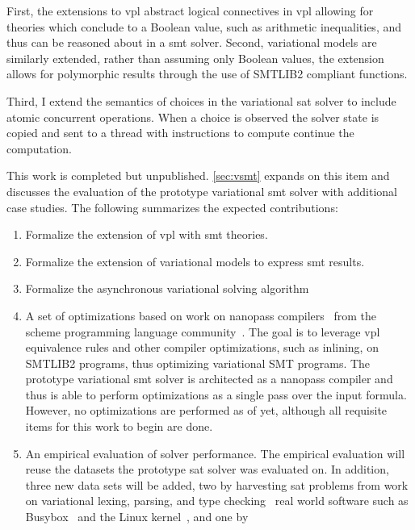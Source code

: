 \begin{enumerate}
  First, the extensions to \ac{vpl} abstract logical connectives in \ac{vpl}
  allowing for theories which conclude to a Boolean value, such as arithmetic
  inequalities, and thus can be reasoned about in a \ac{smt} solver. Second,
  variational models are similarly extended, rather than assuming only Boolean
  values, the extension allows for polymorphic results through the use of
  SMTLIB2 compliant functions.

  Third, I extend the semantics of choices in the variational \ac{sat} solver to
  include atomic concurrent operations. When a choice is observed the solver
  state is copied and sent to a thread with instructions to compute continue the
  computation.

  This work is completed but unpublished. \autoref{sec:vsmt} expands on this
  item and discusses the evaluation of the prototype variational \ac{smt} solver
  with additional case studies. The following summarizes the expected
  contributions:
  \begin{enumerate}
  \item \checkmark{} Formalize the extension of \ac{vpl} with \ac{smt} theories.
  \item \checkmark{} Formalize the extension of variational models to express
    \ac{smt} results.
  \item \checkmark{} Formalize the asynchronous variational solving algorithm
  \item\label{nanopass-deliverable} A set of optimizations based on work on
    nanopass compilers~\cite{10.1145/2500365.2500618} from the scheme
    programming language community~\cite{r7rs-scheme}. The goal is to leverage
    \ac{vpl} equivalence rules and other compiler optimizations, such as
    inlining, on SMTLIB2 programs, thus optimizing variational SMT programs. The
    prototype variational \ac{smt} solver is architected as a nanopass compiler
    and thus is able to perform optimizations as a single pass over the input
    formula. However, no optimizations are performed as of yet, although all
    requisite items for this work to begin are done.
  \item \label{eval-deliverable}An empirical evaluation of solver performance. The empirical evaluation
    will reuse the datasets the prototype \ac{sat} solver was evaluated on. In
    addition, three new data sets will be added, two by harvesting \ac{sat}
    problems from work on variational lexing, parsing, and type
    checking~\cite{KKHL:FOSD10} real world software such as
    Busybox~\cite{busybox} and the Linux kernel~\cite{linux}, and one by

\end{enumerate}
\end{enumerate}
